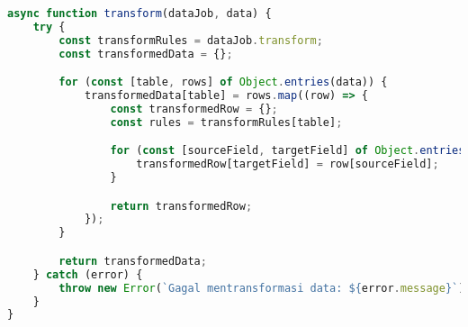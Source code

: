 \begin{lstlisting}[language=Javascript,caption={Transform Data}]
async function transform(dataJob, data) {
	try {
		const transformRules = dataJob.transform;
		const transformedData = {};

		for (const [table, rows] of Object.entries(data)) {
			transformedData[table] = rows.map((row) => {
				const transformedRow = {};
				const rules = transformRules[table];

				for (const [sourceField, targetField] of Object.entries(rules)) {
					transformedRow[targetField] = row[sourceField];
				}

				return transformedRow;
			});
		}

		return transformedData;
	} catch (error) {
		throw new Error(`Gagal mentransformasi data: ${error.message}`);
	}
}
\end{lstlisting}
